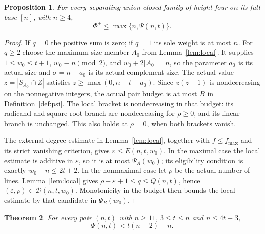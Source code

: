 \documentclass[11pt,a4paper]{amsart}
\theoremstyle{plain}
\newtheorem{theorem}{Theorem}[section]
\newtheorem{proposition}[theorem]{Proposition}
\theoremstyle{definition}
\begin{document}
\begin{proposition}\label{prop:psi}
For every separating union-closed family of height four on its full base
$[n]$, with $n\ge4$,
\[
  \Phi^+\le\max\{n,\Psi(n,t)\}.
\]
\end{proposition}

\begin{proof}
If $q=0$ the positive sum is zero; if $q=1$ its sole weight is at most $n$.
For $q\ge2$ choose the maximum-size member $A_0$ from Lemma~\ref{lem:local}.
It supplies $1\le w_0\le t+1$, $w_0\equiv n\pmod2$, and
$w_0+2|A_0|=n$, so the parameter $a_0$ is its actual size and
$\sigma=n-a_0$ is its actual complement size. The actual value
$z=|S_{A_0}\cap Z|$ satisfies $z\ge\max(0,n-t-a_0)$.
Since $z(z-1)$ is nondecreasing on the nonnegative integers, the actual
pair budget is at most $B$ in Definition~\ref{def:psi}. The local bracket
is nondecreasing in that budget: its radicand and square-root branch are
nondecreasing for $\rho\ge0$, and its linear branch is unchanged. This
also holds at $\rho=0$, when both brackets vanish.

The external-degree estimate in Lemma~\ref{lem:local}, together with
$f\le f_{\max}$ and its strict vanishing criterion, gives
$\varepsilon\le E(n,t,w_0)$. In the maximal case the local estimate is
additive in $\varepsilon$, so it is at most $\Psi_A(w_0)$; its eligibility
condition is exactly $w_0+n\le2t+2$. In the nonmaximal case let $\rho$ be
the actual number of lines. Lemma~\ref{lem:local} gives
$\rho+\varepsilon+1\le q\le Q(n,t)$, hence
$(\varepsilon,\rho)\in\mathcal D(n,t,w_0)$. Monotonicity in the budget
then bounds the local estimate by that candidate in $\Psi_B(w_0)$.
\end{proof}

\begin{theorem}\label{thm:window}
For every pair $(n,t)$ with $n\ge11$, $3\le t\le n$ and $n\le4t+3$,
\[
  \Psi(n,t)<t(n-2)+n.
\]
\end{theorem}
\end{document}
